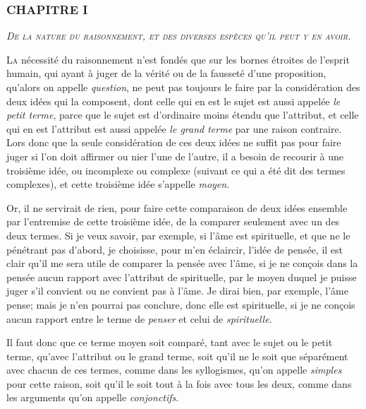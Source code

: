 \subsubsection{\centering \Large CHAPITRE I}
\begin{center}\emph{\large\scshape De la nature du raisonnement, et des diverses espèces qu'il peut y en avoir.}\end{center}

	\lettrine{L}{a} nécessité du raisonnement n'est fondés que sur les bornes étroites de l'esprit humain, qui ayant à juger de la vérité ou de la fausseté d'une proposition, qu'alors on appelle \emph{question}, ne peut pas toujours le faire par la considération des deux idées qui la composent, dont celle qui en est le sujet est aussi appelée \emph{le petit terme}, parce que le sujet est d'ordinaire moins étendu que l'attribut, et celle qui en est l'attribut est aussi appelée \emph{le grand terme} par une raison contraire. Lors donc que la seule considération de ces deux idées ne suffit pas pour faire juger si l'on doit affirmer ou nier l'une de l'autre, il a besoin de recourir à une troisième idée, ou incomplexe ou complexe (suivant ce qui a été dit des termes complexes), et cette troisième idée s'appelle \emph{moyen}.

Or, il ne servirait de rien, pour faire cette comparaison de deux idées ensemble par l'entremise de cette troisième idée, de la comparer seulement avec un des deux termes. Si je veux savoir, par exemple, si l'âme est spirituelle, et que ne le pénétrant pas d'abord, je choisisse, pour m'en éclaircir, l'idée de pensée, il est clair qu'il me sera utile de comparer la pensée avec l'âme, si je ne conçois dans la pensée aucun rapport avec l'attribut de spirituelle, par le moyen duquel je puisse juger s'il convient ou ne convient pas à l'âme. Je dirai bien, par exemple, l'âme pense; mais je n'en pourrai pas conclure, donc elle est spirituelle, si je ne conçois aucun rapport entre le terme de \emph{penser} et celui de \emph{spirituelle}.

Il faut donc que ce terme moyen soit comparé, tant avec le sujet ou le petit terme, qu'avec l'attribut ou le grand terme, soit qu'il ne le soit que séparément avec chacun de ces termes, comme dans les syllogismes, qu'on appelle \emph{simples} pour cette raison, soit qu'il le soit tout à la fois avec tous les deux, comme dans les arguments qu'on appelle \emph{conjonctifs}.


